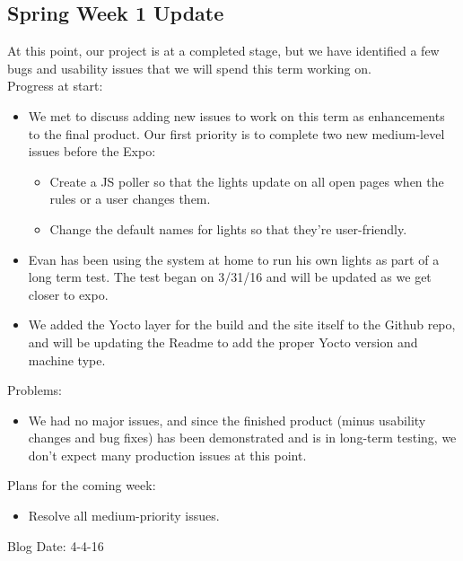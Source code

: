 \subsection{Spring Week 1 Update}
At this point, our project is at a completed stage, but we have identified a few bugs and usability issues that we will spend this term working on.\\
Progress at start:
\begin{itemize}
   \item We met to discuss adding new issues to work on this term as enhancements to the final product. Our first priority is to complete two new medium-level issues before the Expo:
      \begin{itemize}
         \item Create a JS poller so that the lights update on all open pages when the rules or a user changes them.
         \item Change the default names for lights so that they're user-friendly.
      \end{itemize}
   \item Evan has been using the system at home to run his own lights as part of a long term test. The test began on 3/31/16 and will be updated as we get closer to expo.
   \item We added the Yocto layer for the build and the site itself to the Github repo, and will be updating the Readme to add the proper Yocto version and machine type.
\end{itemize}
Problems:
\begin{itemize}
   \item We had no major issues, and since the finished product (minus usability changes and bug fixes) has been demonstrated and is in long-term testing, we don't expect many production issues at this point.
\end{itemize}
Plans for the coming week:
\begin{itemize}
   \item Resolve all medium-priority issues.
\end{itemize}
Blog Date: 4-4-16

